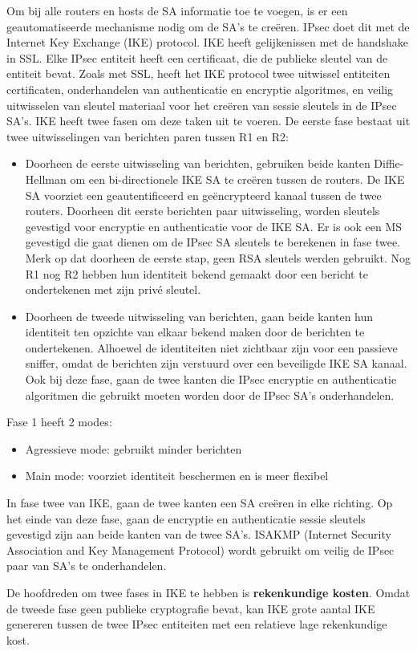 Om bij alle routers en hosts de SA informatie toe te voegen, is er een geautomatiseerde mechanisme nodig om de SA’s te creëren. IPsec doet dit met de Internet Key Exchange (IKE) protocol. IKE heeft gelijkenissen met de handshake in SSL. Elke IPsec entiteit heeft een certificaat, die de publieke sleutel van de entiteit bevat. Zoals met SSL, heeft het IKE protocol twee uitwissel entiteiten certificaten, onderhandelen van authenticatie en encryptie algoritmes, en veilig uitwisselen van sleutel materiaal voor het creëren van sessie sleutels in de IPsec SA’s.
IKE heeft twee fasen om deze taken uit te voeren. De eerste fase bestaat uit twee uitwisselingen van berichten paren tussen R1 en R2:
\begin{itemize}
\item Doorheen de eerste uitwisseling van berichten, gebruiken beide kanten Diffie-Hellman om een bi-directionele IKE SA te creëren tussen de routers. De IKE SA voorziet een geautentificeerd en geëncrypteerd kanaal tussen de twee routers. Doorheen dit eerste berichten paar uitwisseling, worden sleutels gevestigd voor encryptie en authenticatie voor de IKE SA. Er is ook een MS gevestigd die gaat dienen om de IPsec SA sleutels te berekenen in fase twee.
Merk op dat doorheen de eerste stap, geen RSA sleutels werden gebruikt. Nog R1 nog R2 hebben hun identiteit bekend gemaakt door een bericht te ondertekenen met zijn privé sleutel.
\item Doorheen de tweede uitwisseling van berichten, gaan beide kanten hun identiteit ten opzichte van elkaar bekend maken door de berichten te ondertekenen. Alhoewel de identiteiten niet zichtbaar zijn voor een passieve sniffer, omdat de berichten zijn verstuurd over een beveiligde IKE SA kanaal. Ook bij deze fase, gaan de twee kanten die IPsec encryptie en authenticatie algoritmen die gebruikt moeten worden door de IPsec SA’s onderhandelen.
\end{itemize}

\noindent Fase 1 heeft 2 modes:
\begin{itemize}
\item Agressieve mode: gebruikt minder berichten
\item Main mode: voorziet identiteit beschermen en is meer flexibel
\end{itemize}

\noindent In fase twee van IKE, gaan de twee kanten een SA creëren in elke richting. Op het einde van deze fase, gaan de encryptie en authenticatie sessie sleutels gevestigd zijn aan beide kanten van de twee SA’s. ISAKMP (Internet Security Association and Key Management Protocol) wordt gebruikt om veilig de IPsec paar van SA’s te onderhandelen.

\noindent De hoofdreden om twee fases in IKE te hebben is \textbf{rekenkundige kosten}. Omdat de tweede fase geen publieke cryptografie bevat, kan IKE grote aantal IKE genereren tussen de twee IPsec entiteiten met een relatieve lage rekenkundige kost.
